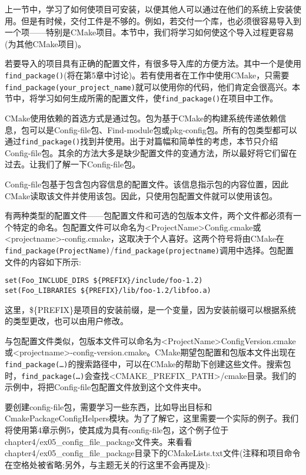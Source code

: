 
上一节中，学习了如何使项目可安装，以便其他人可以通过在他们的系统上安装使用。但是有时候，交付工件是不够的。例如，若交付一个库，也必须很容易导入到一个项——特别是CMake项目。本节中，我们将学习如何使这个导入过程更容易(为其他CMake项目)。

若要导入的项目具有正确的配置文件，有很多导入库的方便方法。其中一个是使用\texttt{find\_package()}(将在第5章中讨论)。若有使用者在工作中使用CMake，只需要\texttt{find\_package(your\_project\_name)}就可以使用你的代码，他们肯定会很高兴。本节中，将学习如何生成所需的配置文件，使\texttt{find\_package()}在项目中工作。

CMake使用依赖的首选方式是通过包。包为基于CMake的构建系统传递依赖信息，包可以是Config-file包、Find-module包或pkg-config包。所有的包类型都可以通过\texttt{find\_package()}找到并使用。出于对篇幅和简单性的考虑，本节只介绍Config-file包。其余的方法大多是缺少配置文件的变通方法，所以最好将它们留在过去。让我们了解一下Config-file包。


Config-file包基于包含包内容信息的配置文件。该信息指示包的内容位置，因此CMake读取该文件并使用该包。因此，只使用包配置文件就可以使用该包。

有两种类型的配置文件——包配置文件和可选的包版本文件，两个文件都必须有一个特定的命名。包配置文件可以命名为<ProjectName>Config.cmake或<projectname>-config.cmake，这取决于个人喜好。这两个符号将由CMake在\texttt{find\_package(ProjectName)}/\texttt{find\_package(projectname)}调用中选择。包配置文件的内容如下所示:

\begin{lstlisting}[style=styleCMake]
set(Foo_INCLUDE_DIRS ${PREFIX}/include/foo-1.2)
set(Foo_LIBRARIES ${PREFIX}/lib/foo-1.2/libfoo.a)
\end{lstlisting}

这里，\$\{PREFIX\}是项目的安装前缀，是一个变量，因为安装前缀可以根据系统的类型更改，也可以由用户修改。

与包配置文件类似，包版本文件可以命名为<ProjectName>ConfigVersion.cmake或<projectname>-config-version.cmake。CMake期望包配置和包版本文件出现在\texttt{find\_package(…)}的搜索路径中，可以在CMake的帮助下创建这些文件。搜索包时，\texttt{find\_package(…)}会查找<CMAKE\_PREFIX\_PATH>/cmake目录。我们的示例中，将把Config-file包配置文件放到这个文件夹中。

要创建config-file包，需要学习一些东西，比如导出目标和CmakePackageConfigHelpers模块。为了了解它，这里需要一个实际的例子。我们将使用第4章示例5，使其成为具有config-file包，这个例子位于chapter4/ex05\_config\_file\_package文件夹。来看看chapter4/ex05\_config\_file\_package目录下的CMakeLists.txt文件(注释和项目命令在空格处被省略;另外，与主题无关的行这里不会再提及):

